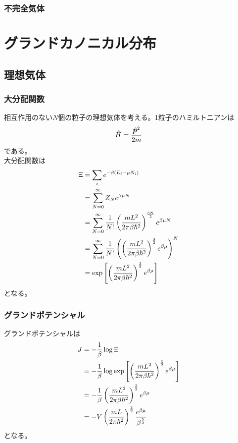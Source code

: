 \documentclass[dvipdfmx, 11pt, a4paper]{jsarticle}
\theoremstyle{definition}
\begin{document}
\subsubsection{不完全気体}
\section{グランドカノニカル分布}
\subsection{理想気体}
\subsubsection{大分配関数}
    相互作用のない$N$個の粒子の理想気体を考える。1粒子のハミルトニアンは
    \begin{align}
        \hat{H} = \frac{\hat{\bm{p}}^2}{2m} \notag
    \end{align}
    である。\\
    大分配関数は
    \begin{align}
        \Xi &= \sum_i e^{-\beta (E_i - \mu N_i)} \notag \\
        &= \sum_{N = 0}^{\infty} Z_{N} e^{\beta \mu N} \notag \\
        &= \sum_{N=0}^{\infty} \frac{1}{N!} \left( \frac{mL^2}{2\pi \beta \hbar^2 } \right)^{\frac{3N}{2}} e^{\beta \mu N} \notag \\
        &= \sum_{N=0}^{\infty} \frac{1}{N!} \left( \left( \frac{mL^2}{2\pi \beta \hbar^2 } \right)^{\frac{3}{2}} e^{\beta \mu} \right)^N \notag \\
        &= \exp \left[ \left( \frac{mL^2}{2\pi \beta \hbar^2 } \right)^{\frac{3}{2}} e^{\beta \mu} \right]
    \end{align}
    となる。
\subsubsection{グランドポテンシャル}
    グランドポテンシャルは
    \begin{align}
        J &= -\frac{1}{\beta} \log \Xi \notag \\
        &= -\frac{1}{\beta} \log  \exp \left[ \left( \frac{mL^2}{2\pi \beta \hbar^2 } \right)^{\frac{3}{2}} e^{\beta \mu} \right] \notag \\
        &= - \frac{1}{\beta} \left( \frac{mL^2}{2\pi \beta \hbar^2 } \right)^{\frac{3}{2}} e^{\beta \mu} \notag \\ 
        &= -V \left( \frac{mL}{2\pi \hbar^2 } \right)^{\frac{3}{2}} \frac{e^{\beta \mu}}{\beta^{\frac{5}{2}}}
    \end{align}
    となる。
\end{document}
